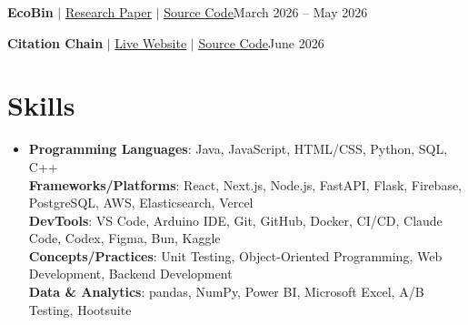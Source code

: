 \documentclass[letterpaper,10pt]{article}
\begin{document}
    \resumeProjectHeading
      {\textbf{EcoBin} $|$ \href{https://arxiv.org/abs/2606.15547}{\underline{Research Paper}} $|$ \href{https://github.com/Raghavsk24/EcoBin}{\underline{Source Code}}}{March 2026 -- May 2026}
      \resumeItemListStart
      \resumeItemListEnd

    \resumeProjectHeading
      {\textbf{Citation Chain} $|$ \href{https://citation-chain-two.vercel.app/}{\underline{Live Website}} $|$ \href{https://github.com/Raghavsk24/Citation-Chain}{\underline{Source Code}}}{June 2026}
      \resumeItemListStart
      \resumeItemListEnd

    \resumeSubHeadingListEnd


\section{Skills}
 \begin{itemize}[leftmargin=0.15in, label={}]
    \item{
     \textbf{Programming Languages}{: Java, JavaScript, HTML/CSS, Python, SQL, C++} \\
     \textbf{Frameworks/Platforms}{: React, Next.js, Node.js, FastAPI, Flask, Firebase, PostgreSQL, AWS, Elasticsearch, Vercel} \\
     \textbf{DevTools}{: VS Code, Arduino IDE, Git, GitHub, Docker, CI/CD, Claude Code, Codex, Figma, Bun, Kaggle} \\
     \textbf{Concepts/Practices}{: Unit Testing, Object-Oriented Programming, Web Development, Backend Development} \\
     \textbf{Data \& Analytics}{: pandas, NumPy, Power BI, Microsoft Excel, A/B Testing, Hootsuite}
    }
 \end{itemize}
 \vspace{3.53pt}

\end{document}
